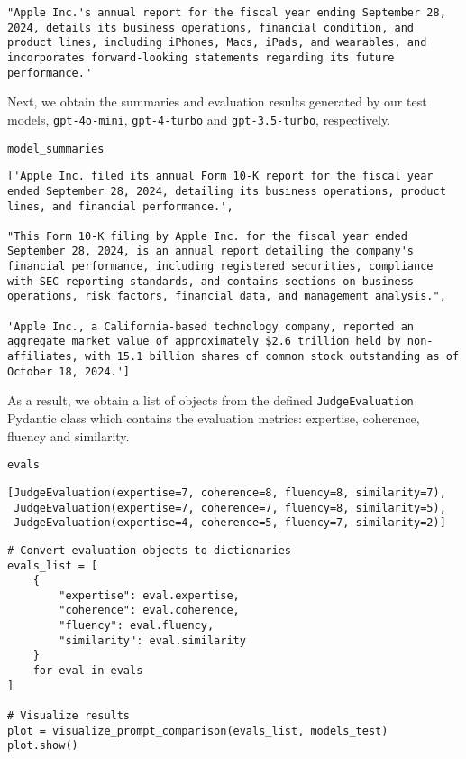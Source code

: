 \begin{verbatim}
"Apple Inc.'s annual report for the fiscal year ending September 28, 2024, details its business operations, financial condition, and product lines, including iPhones, Macs, iPads, and wearables, and incorporates forward-looking statements regarding its future performance."
\end{verbatim}


Next, we obtain the summaries and evaluation results generated by our test models, \texttt{gpt-4o-mini}, \texttt{gpt-4-turbo} and \texttt{gpt-3.5-turbo}, respectively.

\begin{verbatim}
model_summaries
\end{verbatim}

\begin{verbatim}
['Apple Inc. filed its annual Form 10-K report for the fiscal year ended September 28, 2024, detailing its business operations, product lines, and financial performance.',

"This Form 10-K filing by Apple Inc. for the fiscal year ended September 28, 2024, is an annual report detailing the company's financial performance, including registered securities, compliance with SEC reporting standards, and contains sections on business operations, risk factors, financial data, and management analysis.",

'Apple Inc., a California-based technology company, reported an aggregate market value of approximately $2.6 trillion held by non-affiliates, with 15.1 billion shares of common stock outstanding as of October 18, 2024.']
\end{verbatim}


As a result, we obtain a list of objects from the defined \texttt{JudgeEvaluation} Pydantic class which contains the evaluation metrics: expertise, coherence, fluency and similarity.

\begin{verbatim}
evals
\end{verbatim}

\begin{verbatim}
[JudgeEvaluation(expertise=7, coherence=8, fluency=8, similarity=7),
 JudgeEvaluation(expertise=7, coherence=7, fluency=8, similarity=5),
 JudgeEvaluation(expertise=4, coherence=5, fluency=7, similarity=2)]
\end{verbatim}


\begin{verbatim}
# Convert evaluation objects to dictionaries
evals_list = [
    {
        "expertise": eval.expertise,
        "coherence": eval.coherence, 
        "fluency": eval.fluency,
        "similarity": eval.similarity
    }
    for eval in evals
]

# Visualize results
plot = visualize_prompt_comparison(evals_list, models_test)
plot.show()
\end{verbatim}



